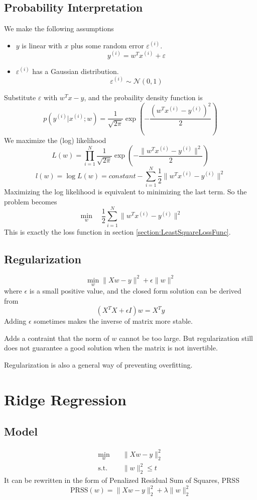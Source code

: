 \subsection{Probability Interpretation}\label{section:LeastSquareProbability}
We make the following assumptions
\begin{itemize}
    \item $y$ is linear with $x$ plus some random error $\varepsilon^{(i)}$.
    \[ y^{(i)} = w^Tx^{(i)} + \varepsilon \]
    \item $\varepsilon^{(i)}$ has a Gaussian distribution.
    \[ \varepsilon^{(i)} \sim \mathcal{N}(0,1) \]
\end{itemize}
Substitute $\varepsilon$ with $w^Tx-y$, and the probaility density function is
\[ p(y^{(i)}|x^{(i)};w) = \frac{1}{\sqrt{2\pi}}\exp\left(-\frac{(w^Tx^{(i)}-y^{(i)})^2}{2}\right) \]
We maximize the (log) likelihood
\[ L(w) = \prod_{i=1}^N \frac{1}{\sqrt{2\pi}}\exp\left(-\frac{\|w^Tx^{(i)}-y^{(i)}\|^2}{2}\right) \]
\[ l(w) = \log L(w) = constant - \sum_{i=1}^N \frac{1}{2}\|w^Tx^{(i)}-y^{(i)}\|^2\]
Maximizing the log likelihood is equivalent to minimizing the last term. So the problem becomes
\[ \min_{w} \quad \frac{1}{2}\sum_{i=1}^N\|w^Tx^{(i)} - y^{(i)}\|^2 \]
This is exactly the loss function in section \ref{section:LeastSquareLossFunc}.
\subsection{Regularization}
\[ \min_w \| Xw - y \|^2 + \epsilon\|w\|^2 \]
where $\epsilon$ is a small positive value, and the closed form solution can be derived from
\[ (X^TX + \epsilon I)w = X^Ty \]
Adding $\epsilon$ sometimes makes the inverse of matrix more stable.
\begin{remark}
    Adds a contraint that the norm of $w$ cannot be too large. But regularization still does not guarantee a good solution when the matrix is not invertible.

    Regularization is also a general way of preventing overfitting.
\end{remark}

\section{Ridge Regression}
\subsection{Model}
\begin{align*}
    \min_w \quad &\| Xw - y \|_2^2 \\
    \text{s.t.} \quad &\|w\|_2^2 \le t
\end{align*}
It can be rewritten in the form of Penalized Residual Sum of Squares, PRSS
\[ \textrm{PRSS}(w) = \|Xw-y\|_2^2 + \lambda\|w\|_2^2 \]

